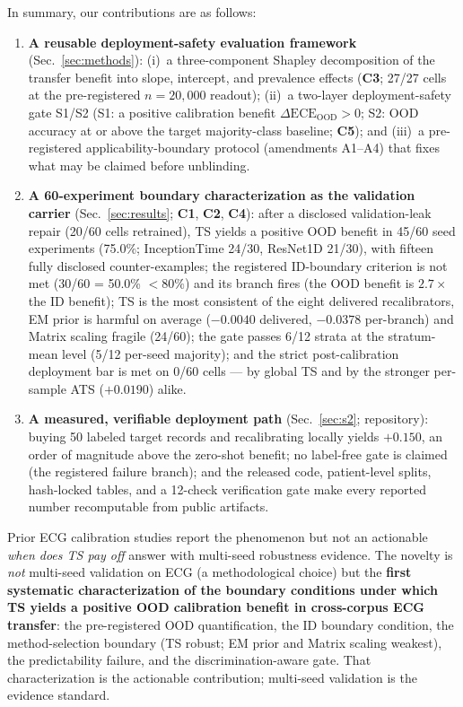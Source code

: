 \documentclass[final,5p,times,nonatbib]{elsarticle}
\begin{document}
In summary, our contributions are as follows:
\begin{enumerate}
    \item \textbf{A reusable deployment-safety evaluation framework}
    (Sec.~\ref{sec:methods}): (i)~a three-component Shapley decomposition
    of the transfer benefit into slope, intercept, and prevalence effects
    (\textbf{C3}; 27/27 cells at the pre-registered $n=20{,}000$
    readout); (ii)~a two-layer deployment-safety gate S1/S2 (S1: a
    positive calibration benefit $\Delta\text{ECE}_{\text{OOD}}>0$; S2:
    OOD accuracy at or above the target majority-class baseline;
    \textbf{C5}); and (iii)~a pre-registered applicability-boundary
    protocol (amendments A1--A4) that fixes what may be claimed before
    unblinding.
    \item \textbf{A 60-experiment boundary characterization as the
    validation carrier} (Sec.~\ref{sec:results}; \textbf{C1},
    \textbf{C2}, \textbf{C4}): after a disclosed validation-leak repair
    (20/60 cells retrained), TS yields a positive OOD benefit in 45/60
    seed experiments (75.0\%; InceptionTime 24/30, ResNet1D 21/30), with
    fifteen fully disclosed counter-examples; the registered ID-boundary
    criterion is not met (30/60 = 50.0\% $<\!80\%$) and its branch fires
    (the OOD benefit is $2.7\times$ the ID benefit); TS is the most
    consistent of the eight delivered recalibrators, EM prior is harmful
    on average ($-0.0040$ delivered, $-0.0378$ per-branch) and Matrix
    scaling fragile (24/60); the gate passes 6/12 strata at the
    stratum-mean level (5/12 per-seed majority); and the strict
    post-calibration deployment bar is met on 0/60 cells --- by global
    TS and by the stronger per-sample ATS ($+0.0190$) alike.
    \item \textbf{A measured, verifiable deployment path}
    (Sec.~\ref{sec:s2}; repository): buying 50 labeled target records
    and recalibrating locally yields $+0.150$, an order of magnitude
    above the zero-shot benefit; no label-free gate is claimed (the
    registered failure branch); and the released code, patient-level
    splits, hash-locked tables, and a 12-check verification gate make
    every reported number recomputable from public artifacts.
\end{enumerate}

Prior ECG calibration studies report the phenomenon
\cite{barandas2023,zhang2022,physiolmeas2026,medrxiv2026} but not an
actionable \emph{when does TS pay off} answer with multi-seed robustness
evidence. The novelty is \emph{not} multi-seed validation on ECG (a
methodological choice) but the \textbf{first systematic characterization
of the boundary conditions under which TS yields a positive OOD
calibration benefit in cross-corpus ECG transfer}: the pre-registered OOD
quantification, the ID boundary condition, the method-selection boundary
(TS robust; EM prior and Matrix scaling weakest), the predictability
failure, and the discrimination-aware gate. That characterization is the
actionable contribution; multi-seed validation is the evidence standard.
\end{document}
